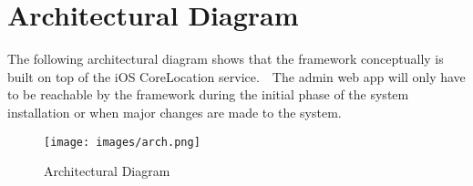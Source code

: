 \chapter{Architectural Diagram}
The following architectural diagram shows that the framework conceptually is built on top of the iOS CoreLocation service.  The admin web app will only have to be reachable by the framework during the initial phase of the system installation or when major changes are made to the system.
\newline
\begin{figure}
\texttt{[image: images/arch.png]}
\caption{Architectural Diagram}
\end{figure}
